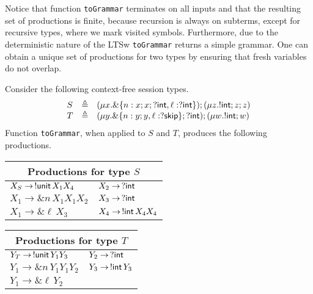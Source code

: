 


Notice that function \lstinline|toGrammar| terminates on all inputs and
that the resulting set of productions is finite, because recursion is
always on subterms, except for recursive types, where we mark visited
symbols.
%
Furthermore, due to the deterministic nature of the LTSw
\lstinline|toGrammar| returns a simple grammar.
%
%
One can obtain a unique set of productions for two types by
ensuring that fresh variables do not overlap.

\begin{example}
\label{ex:productions}
Consider the following context-free session types.
%
\begin{equation*}
\begin{array}{lll}
    S & \triangleq & (\mu x . \&\{n: x;x;?\mathsf{int}, \ell: ?\mathsf{int}\});(\mu z . !\mathsf{int} ; z;z)\\
    T & \triangleq & (\mu y . \&\{n: y;y, \ell: ?\mathsf{skip}\};?\mathsf{int});(\mu w. !\mathsf{int} ; w)
\end{array}
\end{equation*}
%
Function \lstinline{toGrammar}, when applied to $S$ and $T$, produces
the following productions.
\begin{center}
  \begin{tabular}{l l}
    \multicolumn{2}{c}{Productions for type $S$}\\ \hline
    $X_S \rightarrow \,!\mathsf{unit}\, X_1 X_4$ &$X_2 \rightarrow \,? \mathsf{int}$\\
    $X_1 \rightarrow \& n\, X_1 X_1 X_2$&$X_3 \rightarrow \,? \mathsf{int}$\\
    $X_1 \rightarrow \& \ell\, X_3$ &$X_4 \rightarrow \,!\mathsf{int}\, X_4 X_4$\\
  \end{tabular} \qquad
  \begin{tabular}{l l}
    \multicolumn{2}{c}{Productions for type $T$}\\ \hline
    $Y_T \rightarrow \,!\mathsf{unit}\, Y_1 Y_3 $&$Y_2 \rightarrow \,? \mathsf{int}$\\
    $Y_1 \rightarrow \& n\, Y_1 Y_1 Y_2 $&$Y_3 \rightarrow \,!\mathsf{int}\, Y_3$\\
    $Y_1 \rightarrow \& \ell \,Y_2 $ &
  \end{tabular}
\end{center}
\end{example}

